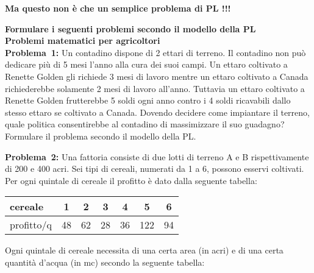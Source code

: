 \documentclass[11pt]{article}
\begin{document}
\begin{center}
   {\LARGE \bf Ma questo non \`e che un semplice problema di PL !!!}
\end{center}

\medskip

{\Large \bf Formulare i seguenti problemi secondo il modello della PL}\\


{\large \bf Problemi matematici per agricoltori}\\

{\sc \bf Problema~1\/:}
Un contadino dispone di 2 ettari di terreno.
Il contadino non pu\`o dedicare pi\`u di 5 mesi l'anno
alla cura dei suoi campi.
Un ettaro coltivato a Renette Golden gli richiede
3 mesi di lavoro mentre un ettaro coltivato
a Canada richiederebbe solamente 2 mesi di lavoro all'anno.
Tuttavia un ettaro coltivato a Renette Golden frutterebbe
5 soldi ogni anno contro i 4 soldi ricavabili dallo stesso
ettaro se coltivato a Canada.
Dovendo decidere come impiantare il terreno, 
quale politica consentirebbe al contadino
di massimizzare il suo guadagno?
Formulare il problema secondo il modello della PL.

\bigskip

{\sc \bf Problema~2\/:}
Una fattoria consiste di due lotti di terreno A e B
rispettivamente di 200 e 400 acri.
Sei tipi di cereali, numerati da 1 a 6,
possono esservi coltivati.
Per ogni quintale di cereale il profitto \`e dato dalla
seguente tabella:

\begin{table}[!htb]
\begin{tabular}{|l|cccccc|} \hline
   cereale    &  1 &  2 &  3 &  4 &   5 &  6 \\
 \hline
   profitto/q & 48 & 62 & 28 & 36 & 122 & 94 \\ 
\hline

\end{tabular}
\end{table}

Ogni quintale di cereale necessita
di una certa area (in acri) e di una certa
quantit\`a d'acqua (in  mc) secondo la seguente tabella:
\end{document}
